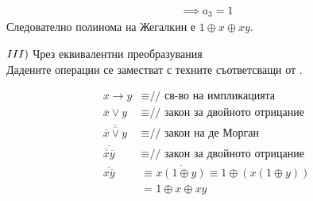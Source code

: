 \begin{alg}
\begin{example}
\begin{align*}
        \implies a_3 = 1
        \end{align*}
        Следователно полинома на Жегалкин е \(1 \oplus x \oplus xy\).
    \end{example}
    \(\newline III)\) Чрез еквивалентни преобразувания \\
    Дадените операции се заместват с техните съответсващи от .
    \begin{example}
        \begin{align*}
            x \to y &\equiv \text{// св-во на импликацията} \\
            \overline{x} \vee y &\equiv \text{// закон за двойното отрицание} \\
            \overline{\overline{\overline{x} \vee y}} &\equiv \text{// закон на де Морган} \\
            \overline{\overline{\overline{x}}\overline{y}} &\equiv \text{// закон за двойното отрицание} \\
            \overline{x\overline{y}} &\equiv \overline{x (1 \oplus y)} \equiv 1 \oplus (x (1 \oplus y)) \\ 
            &= 1 \oplus x \oplus xy
        \end{align*}
    \end{example}
\end{alg}